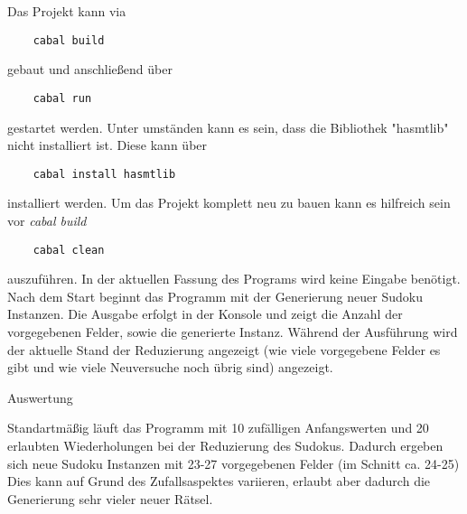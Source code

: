 Das Projekt kann via
    \begin{lstlisting}
    cabal build
    \end{lstlisting}
gebaut und anschließend über
    \begin{lstlisting}
    cabal run
    \end{lstlisting}
gestartet werden. \newline
Unter umständen kann es sein, dass die Bibliothek "hasmtlib" nicht installiert ist. Diese kann über
    \begin{lstlisting}
    cabal install hasmtlib
    \end{lstlisting}
installiert werden. \newline
Um das Projekt komplett neu zu bauen kann es hilfreich sein vor \textit{cabal build}
    \begin{lstlisting}
    cabal clean
    \end{lstlisting}
auszuführen. \newline
In der aktuellen Fassung des Programs wird keine Eingabe benötigt. Nach dem Start beginnt das Programm mit der Generierung neuer Sudoku Instanzen. Die Ausgabe erfolgt in der Konsole und zeigt die Anzahl der vorgegebenen Felder, sowie die generierte Instanz. \newline
Während der Ausführung wird der aktuelle Stand der Reduzierung angezeigt (wie viele vorgegebene Felder es gibt und wie viele Neuversuche noch übrig sind) angezeigt.
\vspace{2ex}

\begin{Large}
    Auswertung
\end{Large}
\vspace{2ex}

Standartmäßig läuft das Programm mit 10 zufälligen Anfangswerten und 20 erlaubten Wiederholungen bei der Reduzierung des Sudokus.
Dadurch ergeben sich neue Sudoku Instanzen mit 23-27 vorgegebenen Felder (im Schnitt ca. 24-25) Dies kann auf Grund des Zufallsaspektes variieren, erlaubt aber dadurch die Generierung sehr vieler neuer Rätsel.



